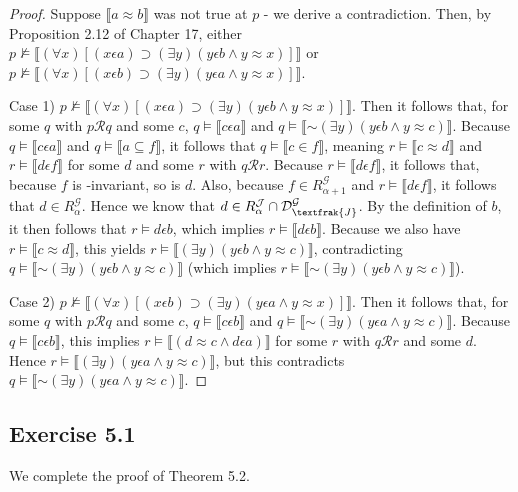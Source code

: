 \documentclass{article}
\newcommand*{\oldneg}{\mathord{\sim}}
\newcommand{\lbc}{\llbracket}
\newcommand{\rbc}{\rrbracket}
\theoremstyle{definition}
\begin{document}
\begin{proof}
Suppose $\lbc a\approx b\rbc$ was not true at $p$ - we derive a contradiction. Then, by Proposition 2.12 of Chapter 17, either 
$p\nvDash\lbc(\forall x)[(x\epsilon a)\supset(\exists y)(y\epsilon b\wedge y\approx x)]\rbc$ or
$p\nvDash\lbc(\forall x)[(x\epsilon b)\supset(\exists y)(y\epsilon a\wedge y\approx x)]\rbc$.

Case 1) $p\nvDash\lbc(\forall x)[(x\epsilon a)\supset(\exists y)(y\epsilon b\wedge y\approx x)]\rbc$. Then it follows that, 
for some $q$ with $p\mathcal{R}q$ and some $c$, $q\vDash\lbc c\epsilon a\rbc$ and
$q\vDash\lbc\oldneg(\exists y)(y\epsilon b\wedge y\approx c)\rbc$. Because $q\vDash\lbc c\epsilon a\rbc$ and 
$q\vDash\lbc a\subseteq f\rbc$, it follows that $q\vDash\lbc c\in f\rbc$, meaning 
$r\vDash\lbc c\approx d\rbc$ and $r\vDash\lbc d\epsilon f\rbc$ for some $d$ and some 
$r$ with $q\mathcal{R}r$. Because $r\vDash\lbc d\epsilon f\rbc$, it follows that, because
$f$ is -invariant, so is $d$. Also, because $f\in R^\mathcal{G}_{\alpha+1}$ and 
$r\vDash\lbc d\epsilon f\rbc$, it follows that $d\in R^\mathcal{G}_\alpha$. Hence we know that 
$d\in R^\mathcal{J}_\alpha\cap\mathcal{D}^\mathcal{G}_\textfrak{J}$. By the definition of 
$b$, it then follows that $r\vDash d\epsilon b$, which implies $r\vDash\lbc d\epsilon b\rbc$. Because we also have 
$r\vDash\lbc c\approx d\rbc$, this yields $r\vDash\lbc(\exists y)(y\epsilon b\wedge y\approx c)\rbc$, contradicting 
$q\vDash\lbc\oldneg(\exists y)(y\epsilon b\wedge y\approx c)\rbc$ (which implies
$r\vDash\lbc\oldneg(\exists y)(y\epsilon b\wedge y\approx c)\rbc$).

Case 2) $p\nvDash\lbc(\forall x)[(x\epsilon b)\supset(\exists y)(y\epsilon a\wedge y\approx x)]\rbc$. Then it follows that,
for some $q$ with $p\mathcal{R}q$ and some $c$, $q\vDash\lbc c\epsilon b\rbc$ and 
$q\vDash\lbc\oldneg(\exists y)(y\epsilon a\wedge y\approx c)\rbc$. Because $q\vDash\lbc c\epsilon b\rbc$, this implies
$r\vDash\lbc (d\approx c\wedge d\epsilon a)\rbc$ for some $r$ with $q\mathcal{R}r$ and some $d$. Hence
$r\vDash\lbc(\exists y)(y\epsilon a\wedge y\approx c)\rbc$, but this contradicts 
$q\vDash\lbc\oldneg(\exists y)(y\epsilon a\wedge y\approx c)\rbc$.

\end{proof}

\subsection*{Exercise 5.1}
We complete the proof of Theorem 5.2.
\end{document}

